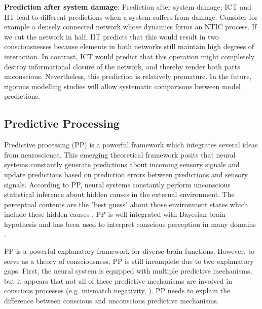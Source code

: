 \documentclass[utf8]{article}
\begin{document}
		    \textbf{Prediction after system damage}: Prediction after system damage: ICT and IIT lead to different predictions when a system suffers from damage. Consider for example a densely connected network whose dynamics forms an NTIC process. If we cut the network in half, IIT predicts that this would result in two consciousnesses because elements in both networks still maintain high degrees of interaction. In contrast, ICT would predict that this operation might completely destroy informational closure of the network, and thereby render both parts unconscious. Nevertheless, this prediction is relatively premature. In the future, rigorous modelling studies will allow systematic comparisons between model predictions.
	    

		\subsection{Predictive Processing}
    		Predictive processing (PP) is a powerful framework which integrates several ideas from neuroscience. This emerging theoretical framework posits that neural systems constantly generate predictions about incoming sensory signals and update predictions based on prediction errors between predictions and sensory signals. According to PP, neural systems constantly perform unconscious statistical inference about hidden causes in the external environment. The perceptual contents are the "best guess" about those environment states which include these hidden causes \citep{clark_2013, Hohwy2013}. PP is well integrated with Bayesian brain hypothesis and has been used to interpret conscious perception in many domains \citep{Hohwy2013, seth2014predictive}.
    		
    		PP is a powerful explanatory framework for diverse brain functions. However, to serve as a theory of consciousness, PP is still incomplete due to two explanatory gaps. First, the neural system is equipped with multiple predictive mechanisms, but it appears that not all of these predictive mechanisms are involved in conscious processes (e.g. mismatch negativity, \cite{naatanen2007mismatch}). PP needs to explain the difference between conscious and unconscious predictive mechanisms. 
    		
\end{document}

